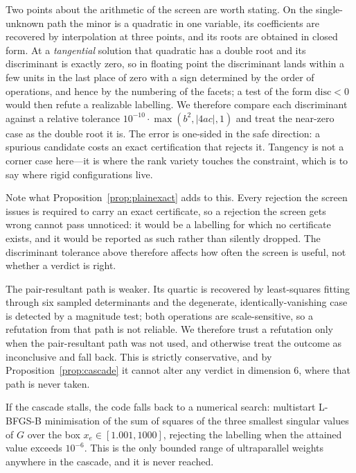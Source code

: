 \documentclass[11pt,reqno]{amsart}
\theoremstyle{plain}
\theoremstyle{definition}
\newcommand{\Gr}{G}
\begin{document}
Two points about the arithmetic of the screen are worth stating. On the single-unknown path the
minor is a quadratic in one variable, its coefficients are recovered by
interpolation at three points, and its roots are obtained in closed form. At a
\emph{tangential} solution that quadratic has a double root and its discriminant
is exactly zero, so in floating point the discriminant lands within a few units in
the last place of zero with a sign determined by the order of operations, and hence
by the numbering of the facets; a test of the form $\mathrm{disc}<0$ would then
refute a realizable labelling. We therefore compare each discriminant against a
relative tolerance $10^{-10}\cdot\max(b^2,|4ac|,1)$ and treat the near-zero case as
the double root it is. The error is one-sided in the safe direction: a spurious
candidate costs an exact certification that rejects it. Tangency is not a corner
case here---it is where the rank variety touches the constraint, which is to say
where rigid configurations live.

Note what Proposition~\ref{prop:plainexact} adds to this. Every rejection the
screen issues is required to carry an exact certificate, so a rejection the screen
gets wrong cannot pass unnoticed: it would be a labelling for which no certificate
exists, and it would be reported as such rather than silently dropped. The
discriminant tolerance above therefore affects how often the screen is useful, not
whether a verdict is right.

The pair-resultant path is weaker. Its quartic is recovered by least-squares
fitting through six sampled determinants and the degenerate,
identically-vanishing case is detected by a magnitude test; both operations are
scale-sensitive, so a refutation from that path is not reliable. We therefore trust
a refutation only when the pair-resultant path was not used, and otherwise treat
the outcome as inconclusive and fall back. This is strictly conservative, and by
Proposition~\ref{prop:cascade} it cannot alter any verdict in dimension $6$,
where that path is never taken.

If the cascade stalls, the code falls back to a numerical search: multistart
L-BFGS-B minimisation of the sum of squares of the three smallest singular
values of $\Gr$ over the box $x_e\in[1.001,1000]$, rejecting the labelling when
the attained value exceeds $10^{-6}$. This is the only bounded range of
ultraparallel weights anywhere in the cascade, and it is never reached.
\end{document}
